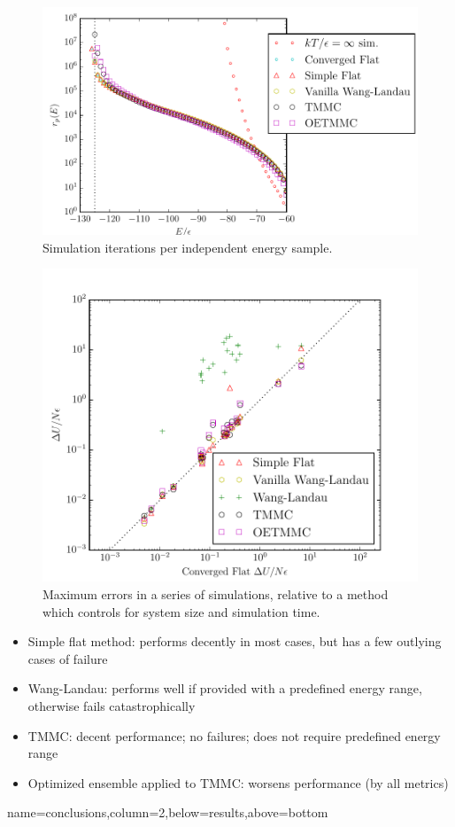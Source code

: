 \documentclass[paperwidth=48in,paperheight=36in,
fontscale=0.27,margin=0.75in]{baposter}
\begin{document}
\begin{poster}
{    \begin{figure}[H]
      \centering
      \includegraphics[width=0.6\columnwidth]{figs/sample-rates.pdf}
      \caption{Simulation iterations per independent energy sample.}
      \label{fig:sample_rates}
    \end{figure}
    \begin{figure}[H]
      \centering
      \includegraphics[width=0.5\columnwidth]{figs/u-comps.pdf}
      \caption{Maximum errors in a series of simulations, relative to
        a method which controls for system size and simulation time.}
      \label{fig:errors}
    \end{figure}

    \begin{itemize}
    \item Simple flat method: performs decently in most cases, but has
      a few outlying cases of failure
    \item Wang-Landau: performs well if provided with a predefined
      energy range, otherwise fails catastrophically
    \item TMMC: decent performance; no failures; does not require
      predefined energy range
    \item Optimized ensemble applied to TMMC: worsens performance (by
      all metrics)
    \end{itemize}

  }

  {name=conclusions,column=2,below=results,above=bottom}{%

}
\end{poster}
\end{document}
